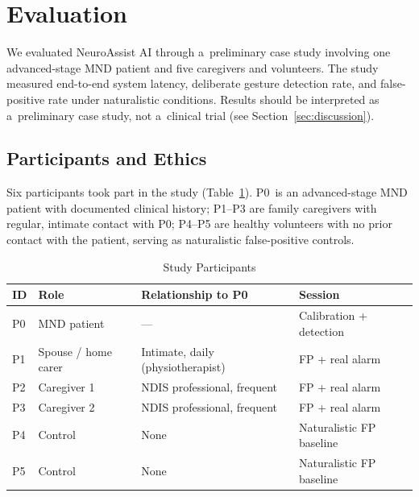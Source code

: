 
\section{Evaluation}
\label{sec:evaluation}

We evaluated NeuroAssist AI through a~preliminary case study involving one
advanced-stage MND patient and five caregivers and volunteers. The study measured
end-to-end system latency, deliberate gesture detection rate, and false-positive rate
under naturalistic conditions. Results should be interpreted as a~preliminary case
study, not a~clinical trial (see Section~\ref{sec:discussion}).

\subsection{Participants and Ethics}
\label{sec:participants}

Six participants took part in the study (Table~\ref{tab:participants}).
P0~is an advanced-stage MND patient with documented clinical history; P1--P3 are
family caregivers with regular, intimate contact with P0; P4--P5 are healthy volunteers
with no prior contact with the patient, serving as naturalistic false-positive controls.

\begin{table}[!t]
  \renewcommand{\arraystretch}{1.15}
  \caption{Study Participants}
  \label{tab:participants}
  \centering
  \begin{tabular}{llll}
    \toprule
    ID & Role & Relationship to P0 & Session \\
    \midrule
    P0 & MND patient          & ---                              & Calibration + detection \\
    P1 & Spouse / home carer  & Intimate, daily (physiotherapist) & FP + real alarm \\
    P2 & Caregiver 1          & NDIS professional, frequent      & FP + real alarm \\
    P3 & Caregiver 2          & NDIS professional, frequent      & FP + real alarm \\
    P4 & Control           & None                 & Naturalistic FP baseline \\
    P5 & Control           & None                 & Naturalistic FP baseline \\
    \bottomrule
  \end{tabular}
\end{table}

